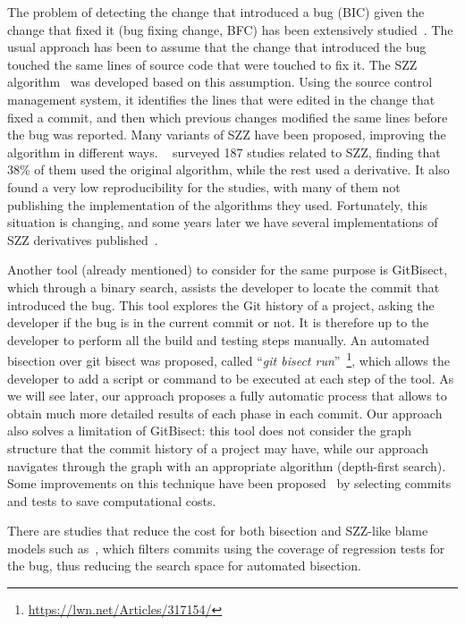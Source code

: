 The problem of detecting the change that introduced a bug (BIC) given the change that fixed it (bug fixing change, BFC) has been extensively studied~\cite{sinha2010buginnings,davies2014comparing,sliwerski2005changes,kim2006automatic,williams2008szz,kamei2012large,tantithamthavorn2013mining}. The usual approach has been to assume that the change that introduced the bug touched the same lines of source code that were touched to fix it. The SZZ algorithm~\cite{sliwerski2005changes} was developed based on this assumption. Using the source control management system, it identifies the lines that were edited in the change that fixed a commit, and then which previous changes modified the same lines before the bug was reported. Many variants of SZZ have been proposed, improving the algorithm in different ways. \gema~\cite{rodriguez2018reproducibility} surveyed 187 studies related to SZZ, finding that 38\% of them used the original algorithm, while the rest used a derivative. It also found a very low reproducibility for the studies, with many of them not publishing the implementation of the algorithms they used. Fortunately, this situation is changing, and some years later we have several implementations of SZZ derivatives published~\cite{borg2019szz,lenarduzzi2020openszz,pokropinski2022szz,rosa2021evaluating}.

Another tool (already mentioned) to consider for the same purpose is GitBisect, which through a binary search, assists the developer to locate the commit that introduced the bug. This tool explores the Git history of a project, asking the developer if the bug is in the current commit or not. 
It is therefore up to the developer to perform all the build and testing steps manually. 
An automated bisection over git bisect was proposed, called ``\textit{git bisect run}''~\footnote{\url{https://lwn.net/Articles/317154/}}, which allows the developer to add a script or command to be executed at each step of the tool.
As we will see later, our approach proposes a fully automatic process that allows to obtain much more detailed results of each phase in each commit. 
Our approach also solves a limitation of GitBisect: this tool does not consider the graph structure that the commit history of a project may have, while our approach navigates through the graph with an appropriate algorithm (depth-first search).
Some improvements on this technique have been proposed~\cite{saha2017selective} by selecting commits and tests to save computational costs.

There are studies that reduce the cost for both bisection and SZZ-like blame models such as~\cite{an2021reducing}, which filters commits using the coverage of regression tests for the bug, thus reducing the search space for automated bisection.

